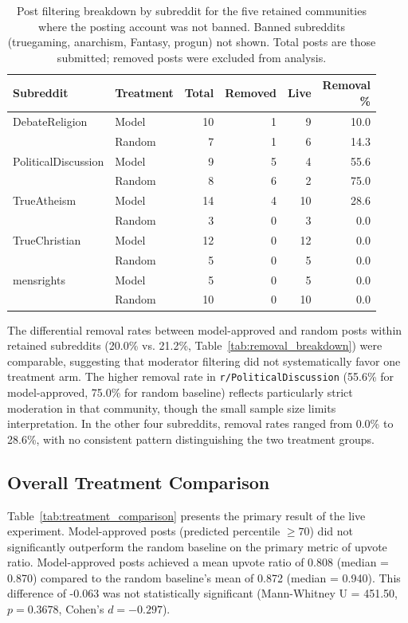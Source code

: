 \begin{table}[htbp]
\centering
\caption{Post filtering breakdown by subreddit for the five retained communities where the posting account was not banned. Banned subreddits (truegaming, anarchism, Fantasy, progun) not shown. Total posts are those submitted; removed posts were excluded from analysis.}
\label{tab:subreddit_filtering_live_experiment}
\begin{tabular}{llrrrr}
\toprule
Subreddit & Treatment & Total & Removed & Live & \makecell{Removal\\\%} \\
\midrule
DebateReligion & Model & 10 & 1 & 9 & 10.0 \\
 & Random & 7 & 1 & 6 & 14.3 \\
\midrule
PoliticalDiscussion & Model & 9 & 5 & 4 & 55.6 \\
 & Random & 8 & 6 & 2 & 75.0 \\
\midrule
TrueAtheism & Model & 14 & 4 & 10 & 28.6 \\
 & Random & 3 & 0 & 3 & 0.0 \\
\midrule
TrueChristian & Model & 12 & 0 & 12 & 0.0 \\
 & Random & 5 & 0 & 5 & 0.0 \\
\midrule
mensrights & Model & 5 & 0 & 5 & 0.0 \\
 & Random & 10 & 0 & 10 & 0.0 \\
\bottomrule
\end{tabular}
\end{table}

The differential removal rates between model-approved and random posts within retained subreddits (20.0\% vs. 21.2\%, Table~\ref{tab:removal_breakdown}) were comparable, suggesting that moderator filtering did not systematically favor one treatment arm. The higher removal rate in \verb!r/PoliticalDiscussion! (55.6\% for model-approved, 75.0\% for random baseline) reflects particularly strict moderation in that community, though the small sample size limits interpretation. In the other four subreddits, removal rates ranged from 0.0\% to 28.6\%, with no consistent pattern distinguishing the two treatment groups.

\subsection{Overall Treatment Comparison}
\label{subsec:overall_treatment}

Table~\ref{tab:treatment_comparison} presents the primary result of the live experiment. Model-approved posts (predicted percentile $\geq 70$) did not significantly outperform the random baseline on the primary metric of upvote ratio. Model-approved posts achieved a mean upvote ratio of 0.808 (median = 0.870) compared to the random baseline's mean of 0.872 (median = 0.940). This difference of -0.063 was not statistically significant (Mann-Whitney U = 451.50, $p = 0.3678$, Cohen's $d = -0.297$).

